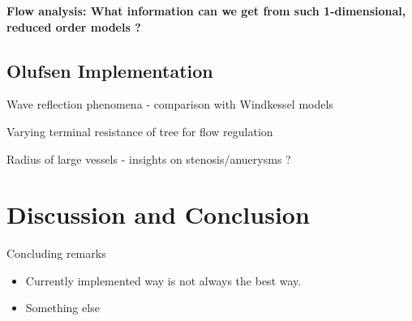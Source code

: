 \documentclass{beamer}
\begin{document}

\begin{frame}
	\begin{center}
		\Large{\textbf{Flow analysis: What information can we get from such 1-dimensional, reduced order models ?}}
	\end{center}
\end{frame}

\subsection{Olufsen Implementation}

\begin{frame}{Wave reflection phenomena - comparison with Windkessel models}

\end{frame}


\begin{frame}{Varying terminal resistance of tree for flow regulation}

\end{frame}


\begin{frame}{Radius of large vessels - insights on stenosis/anuerysms ?}

\end{frame}

\section{Discussion and Conclusion}

\begin{frame}{Concluding remarks}
\begin{itemize}
	\item
	Currently implemented way is not always the best way.
	\item
	Something else
\end{itemize}
\end{frame}
\end{document}
